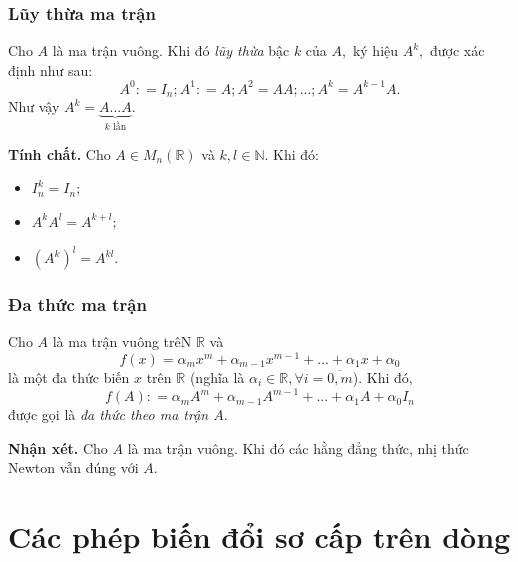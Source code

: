 \subsubsection{Lũy thừa ma trận}
Cho $A$ là ma trận vuông. Khi đó \textit{lũy thừa} bậc $k$ của $A,$ ký hiệu $A^k,$ được xác định như sau:
$${A^0}: = {I_n};{A^1}: = A;{A^2} = AA;...;{A^k} = {A^{k - 1}}A.$$
Như vậy ${A^k} = \underbrace {A...A}_{k \text{ lần}}.$
\begin{mybox}
\textbf{Tính chất.} Cho $A \in M_n \left( {\mathbb{R}} \right)$ và $k, l \in \mathbb{N}.$ Khi đó:
\begin{itemize}
\item $I_n^k = I_n;$
\item $A^k A^l = A^{k + l};$
\item $\left( {A^k} \right)^l = A^{kl}.$
\end{itemize}
\end{mybox}
\subsubsection{Đa thức ma trận}
Cho $A$ là ma trận vuông trêN $\mathbb{R}$ và
$$f\left( x \right) = {\alpha _m}{x^m} + {\alpha _{m - 1}}{x^{m - 1}} + ... + {\alpha _1}x + {\alpha _0}$$
là một đa thức biến $x$ trên $\mathbb{R}$ (nghĩa là ${\alpha _i} \in \mathbb{R},\forall i = \overline {0,m}$). Khi đó,
$$f\left( A \right): = {\alpha _m}{A^m} + {\alpha _{m - 1}}{A^{m - 1}} + ... + {\alpha _1}A + {\alpha _0}{I_n}$$
được gọi là \textit{đa thức theo ma trận $A.$}
\begin{mybox}
\textbf{Nhận xét.} Cho $A$ là ma trận vuông. Khi đó các hằng đẳng thức, nhị thức Newton vẫn đúng với $A.$
\end{mybox}
\section{Các phép biến đổi sơ cấp trên dòng}
